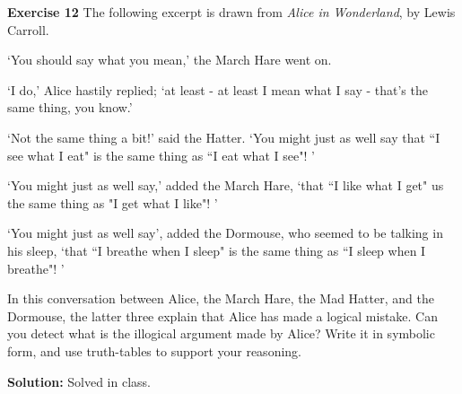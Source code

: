 \documentclass[12pt,oneside]{exam}
\newenvironment{exercise}[1]{\vspace{.1in}\noindent\textbf{Exercise #1 \hspace{.05em}}}{}
\newenvironment{newsolution}{\vspace{.1in}\noindent\textbf{Solution: \hspace{.05em}}}{}
\begin{document}
\begin{exercise}{12}
The following excerpt is drawn from \textit{Alice in Wonderland}, by Lewis Carroll. 

`You should say what you mean,' the March Hare went on. 

`I do,' Alice hastily replied; `at least - at least I mean what I say - that's the same thing, you know.'

`Not the same thing a bit!' said the Hatter. `You might just as well say that ``I see what I eat" is the same thing as ``I eat what I see"! '

`You might just as well say,' added the March Hare, `that ``I like what I get" us the same thing as "I get what I like"! '

`You might just as well say', added the Dormouse, who seemed to be talking in his sleep, `that ``I breathe when I sleep" is the same thing as ``I sleep when I breathe"! '


In this conversation between Alice, the March Hare, the Mad Hatter, and the Dormouse, the latter three explain that Alice has made a logical mistake. Can you detect what is the illogical argument made by Alice? Write it in symbolic form, and use truth-tables to support your reasoning. 
\end{exercise}

\begin{newsolution}
Solved in class.
\end{newsolution}
\end{document}
